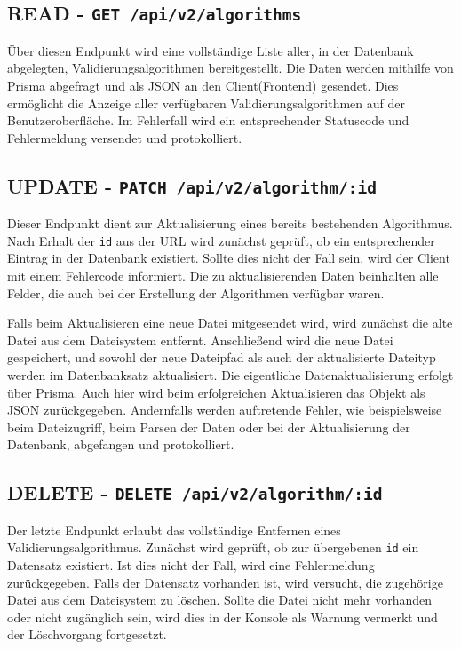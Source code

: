\subsection{READ - \texttt{GET /api/v2/algorithms}}

Über diesen Endpunkt wird eine vollständige Liste aller, in der Datenbank abgelegten, Validierungsalgorithmen bereitgestellt. Die Daten werden mithilfe von Prisma abgefragt und als JSON an den Client(Frontend) gesendet. Dies ermöglicht die Anzeige aller verfügbaren Validierungsalgorithmen auf der Benutzeroberfläche. Im Fehlerfall wird ein entsprechender Statuscode und Fehlermeldung versendet und protokolliert.

\subsection{UPDATE - \texttt{PATCH /api/v2/algorithm/:id}}

Dieser Endpunkt dient zur Aktualisierung eines bereits bestehenden Algorithmus. Nach Erhalt der \texttt{id} aus der URL wird zunächst geprüft, ob ein entsprechender Eintrag in der Datenbank existiert. Sollte dies nicht der Fall sein, wird der Client mit einem Fehlercode informiert. Die zu aktualisierenden Daten beinhalten alle Felder, die auch bei der Erstellung der Algorithmen verfügbar waren.

Falls beim Aktualisieren eine neue Datei mitgesendet wird, wird zunächst die alte Datei aus dem Dateisystem entfernt. Anschließend wird die neue Datei gespeichert, und sowohl der neue Dateipfad als auch der aktualisierte Dateityp werden im Datenbanksatz aktualisiert. Die eigentliche Datenaktualisierung erfolgt über Prisma. Auch hier wird beim erfolgreichen Aktualisieren das Objekt als JSON zurückgegeben. Andernfalls werden auftretende Fehler, wie beispielsweise beim Dateizugriff, beim Parsen der Daten oder bei der Aktualisierung der Datenbank, abgefangen und protokolliert.

\subsection{DELETE - \texttt{DELETE /api/v2/algorithm/:id}}

Der letzte Endpunkt erlaubt das vollständige Entfernen eines Validierungsalgorithmus. Zunächst wird geprüft, ob zur übergebenen \texttt{id} ein Datensatz existiert. Ist dies nicht der Fall, wird eine Fehlermeldung zurückgegeben. Falls der Datensatz vorhanden ist, wird versucht, die zugehörige Datei aus dem Dateisystem zu löschen. Sollte die Datei nicht mehr vorhanden oder nicht zugänglich sein, wird dies in der Konsole als Warnung vermerkt und der Löschvorgang fortgesetzt.


